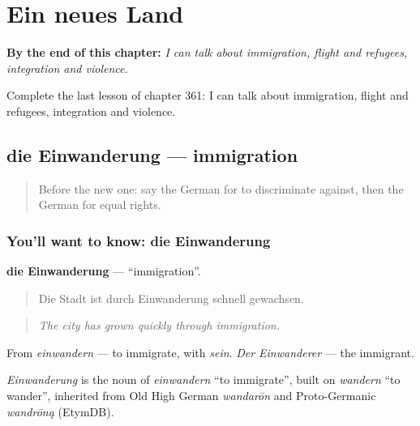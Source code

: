 
\chapter{Ein neues Land}
\label{ch:ge-ein-neues-land}

\begin{chapteropening}
\textbf{By the end of this chapter:} \emph{I can talk about immigration, flight and refugees, integration and violence.}

Complete the last lesson of chapter 361: I can talk about immigration, flight and refugees, integration and violence.
\end{chapteropening}

\section[die Einwanderung]{die Einwanderung — immigration}

\label{lesson:GE-C361-einwanderung}



\begin{quote}
Before the new one: say the German for to discriminate against, then the German for equal rights.
\end{quote}

\subsection*{You'll want to know: die Einwanderung}
\textbf{die Einwanderung} — \textquotedblleft{}immigration\textquotedblright{}.

\begin{quote}
Die Stadt ist durch Einwanderung schnell gewachsen.
\end{quote}

\begin{quote}
\emph{The city has grown quickly through immigration.}
\end{quote}

From \emph{einwandern} — to immigrate, with \emph{sein}. \emph{Der Einwanderer} — the immigrant.

\begin{cousinweb}
\emph{Einwanderung} is the noun of \emph{einwandern} \textquotedblleft{}to immigrate\textquotedblright{}, built on \emph{wandern} \textquotedblleft{}to wander\textquotedblright{}, inherited from Old High German \emph{wandarōn} and Proto-Germanic \emph{wandrōną} (EtymDB).
\end{cousinweb}

